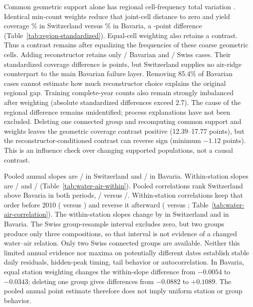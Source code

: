 \documentclass[draft,linenumbers]{agujournal2025}
\begin{document}
Common geometric support alone has regional cell-frequency total variation \PRRGeometryRawTV{}. Identical min-count weights reduce that joint-cell distance to zero and yield coverage \PRRGeometryMinFoenCov\% in Switzerland versus \PRRGeometryMinBavariaCov\% in Bavaria, a \PRRGeometryMinGap{}-point difference (Table~\ref{tab:region-standardized}). Equal-cell weighting also retains a contrast. Thus a contrast remains after equalizing the frequencies of these coarse geometric cells. Adding reconstructor retains only \PRRPolicyBavariaSupported{}/\PRRPolicyBavariaTotal{} Bavarian and \PRRPolicyFoenSupported{}/\PRRPolicyFoenTotal{} Swiss cases. Their standardized coverage difference is \PRRPolicyMinGap{} points, but Switzerland supplies no air-ridge counterpart to the main Bavarian failure layer. Removing 85.4\% of Bavarian cases cannot estimate how much reconstructor choice explains the original regional gap. Training complete-year counts also remain strongly imbalanced after weighting (absolute standardized differences exceed 2.7). The cause of the regional difference remains unidentified; process explanations have not been excluded. Deleting one connected group and recomputing common support and weights leaves the geometric coverage contrast positive (12.39--17.77 points), but the reconstructor-conditioned contrast can reverse sign (minimum $-1.12$ points). This is an influence check over changing supported populations, not a causal contrast.




Pooled annual slopes are \PRWFoenPooledBeforeSlope{}/\PRWFoenPooledAfterSlope{} in Switzerland and \PRWBavariaPooledBeforeSlope{}/\PRWBavariaPooledAfterSlope{} in Bavaria. Within-station slopes are \PRWFoenWithinBeforeSlope{}/\PRWFoenWithinAfterSlope{} and \PRWBavariaWithinBeforeSlope{}/\PRWBavariaWithinAfterSlope{} (Table~\ref{tab:water-air-within}). Pooled correlations rank Switzerland above Bavaria in both periods, \PRWFoenPooledBeforeCorr{}/\PRWFoenPooledAfterCorr{} versus \PRWBavariaPooledBeforeCorr{}/\PRWBavariaPooledAfterCorr{}. Within-station correlations keep that order before 2010 (\PRWFoenWithinBeforeCorr{} versus \PRWBavariaWithinBeforeCorr{}) and reverse it afterward (\PRWFoenWithinAfterCorr{} versus \PRWBavariaWithinAfterCorr{}; Table~\ref{tab:water-air-correlation}). The within-station slopes change by \PRWFoenWithinSlopeDelta{} in Switzerland and \PRWBavariaWithinSlopeDelta{} in Bavaria. The Swiss group-resample interval excludes zero, but two groups produce only three compositions, so that interval is not evidence of a changed water--air relation. Only two Swiss connected groups are available. Neither this limited annual evidence nor maxima on potentially different dates establish stable daily residuals, hidden-peak timing, tail behavior or autocorrelation. In Bavaria, equal station weighting changes the within-slope difference from $-0.0054$ to $-0.0343$; deleting one group gives differences from $-0.0882$ to $+0.1089$. The pooled annual point estimate therefore does not imply uniform station or group behavior.
\end{document}
